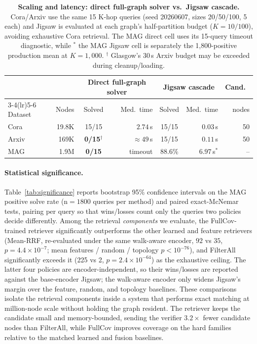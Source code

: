 \documentclass[runningheads]{llncs}
\begin{document}
\begin{table}[t]
\centering
\caption{\textbf{Scaling and latency: direct full-graph solver vs.\ Jigsaw cascade.} Cora/Arxiv use the same 15 K-hop queries (seed 20260607, sizes 20/50/100, 5 each) and Jigsaw is evaluated at each graph's half-partition budget ($K=10/100$), avoiding exhaustive Cora retrieval. The MAG direct cell uses its 15-query timeout diagnostic, while $^\ast$ the MAG Jigsaw cell is separately the 1,800-positive production mean at $K=1{,}000$. $^\dagger$ Glasgow's 30\,s Arxiv budget may be exceeded during cleanup/loading.}
\label{tab:scaling_latency}
\small
\begin{tabular}{l r c r c r r}
\toprule
 & & \multicolumn{2}{c}{Direct full-graph solver} & \multicolumn{2}{c}{Jigsaw cascade} & Cand.\ \\
\cmidrule(lr){3-4}\cmidrule(lr){5-6}
Dataset & Nodes & Solved & Med.\ time & Solved & Med.\ time & nodes \\
\midrule
Cora  & 19.8K & 15/15 & $2.74$\,s & 15/15 & $\mathbf{0.03}$\,s & 50 \\
Arxiv & 169K  & \textbf{0/15}$^\dagger$ & ${\approx}49$\,s & 15/15 & $\mathbf{0.11}$\,s & 50 \\
MAG   & 1.9M  & \textbf{0/15} & timeout & 88.6\% & $6.97$\,s$^\ast$ & -- \\
\bottomrule
\end{tabular}
\end{table}

\paragraph{Statistical significance.}
Table~\ref{tab:significance} reports bootstrap 95\% confidence intervals on the MAG positive solve rate (n${=}1800$ queries per method) and paired exact-McNemar tests, pairing per query so that wins/losses count only the queries two policies decide differently. Among the retrieval \emph{components} we evaluate, the FullCov-trained retriever significantly outperforms the other learned and feature retrievers (Mean-RRF, re-evaluated under the same walk-aware encoder, $92$ vs $35$, $p{=}4.4{\times}10^{-7}$; mean features / random / topology $p<10^{-76}$), and FilterAll significantly exceeds it (225 vs 2, $p{=}2.4{\times}10^{-64}$) as the exhaustive ceiling. The latter four policies are encoder-independent, so their wins/losses are reported against the base-encoder Jigsaw; the walk-aware encoder only widens Jigsaw's margin over the feature, random, and topology baselines. These comparisons isolate the retrieval components inside a system that performs exact matching at million-node scale without holding the graph resident. The retriever keeps the candidate small and memory-bounded, sending the verifier $3.2\times$ fewer candidate nodes than FilterAll, while FullCov improves coverage on the hard families relative to the matched learned and fusion baselines.
\end{document}

